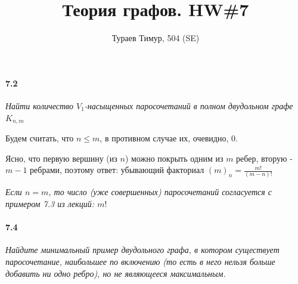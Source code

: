 \documentclass[russian]{article}
\begin{document}
\title{Теория графов. HW\#7}
\author{Тураев Тимур, 504 (SE)}

\maketitle

\paragraph{7.2} \textit{Найти количество $V_1$-насыщенных паросочетаний в полном двудольном графе $K_{n, m}$}

Будем считать, что $n \leqslant m$, в противном случае их, очевидно, $0$.

Ясно, что первую вершину (из $n$) можно покрыть одним из $m$ ребер, вторую - $m-1$ ребрами, поэтому ответ: убывающий факториал  $(m)_n = \frac{m!}{(m-n)!}$ 

\textit{Если $n=m$, то число (уже совершенных) паросочетаний согласуется с примером 7.3 из лекций: $m!$}

\paragraph{7.4} \textit{Найдите минимальный пример двудольного графа, в котором существует паросочетание, наибольшее по включению (то есть в него нельзя больше добавить ни одно ребро), но не являющееся максимальным.}
\end{document}
